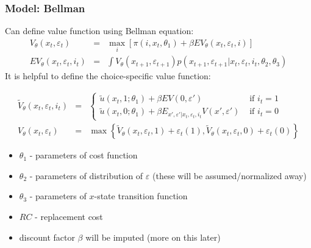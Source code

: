 \documentclass[xcolor=pdftex,dvipsnames,table,mathserif,aspectratio=169]{beamer}
\begin{document}
\begin{frame}
\frametitle{Model: Bellman}
\footnotesize
 Can define value function using Bellman equation:
 \begin{eqnarray*}
		V_{\theta}\left(x_{t},\varepsilon_{t}\right) &=& \max_{i} \left[ \pi \left(i,x_{t},\theta_1 \right) +
		\beta EV_{\theta}\left(x_{t},\varepsilon_{t},i \right) \right]\\
	 EV_{\theta}\left(x_{t},\varepsilon_{t},i_{t}\right) &=& \int V_{\theta}\left(x_{t+1},\varepsilon_{t+1}\right) p\left(x_{t+1}, \varepsilon_{t+1} |x_{t},\varepsilon_{t},i_{t},\theta_{2},\theta_{3}\right)
\end{eqnarray*}
It is helpful to define the \alert{choice-specific value function}:


\begin{eqnarray*}
\tilde V_{\theta} (x_t, \varepsilon_t, i_t) &=& \left \{ 
\begin{array}{lr}
\tilde u(x_t, 1;\theta_1) + \beta EV(0, \varepsilon ')  & \text{ if } i_t = 1 \\
\tilde u(x_t , 0; \theta_1) + \beta E_{x', \varepsilon ' | x_t, \varepsilon_t, i_t} V(x', \varepsilon ')   & \text{ if } i_t = 0
\end{array}
\right .\\
V_{\theta}(x_t,\varepsilon_t) &=& \max \left\{ \tilde V_{\theta} (x_t, \varepsilon_t, 1) + \varepsilon_{t}(1) ,\tilde V_{\theta} (x_t, \varepsilon_t, 0) + \varepsilon_{t}(0) \right\}
\end{eqnarray*}
\begin{itemize}
	\item $\theta_{1}$ - parameters of cost function
	\item $\theta_{2}$ - parameters of distribution of $\varepsilon$ (these will be assumed/normalized away)
	\item $\theta_{3}$ - parameters of $x$-state transition function
	\item $RC$ - replacement cost
	\item discount factor $\beta$ will be imputed (more on this later)
\end{itemize}
\end{frame}
\end{document}
